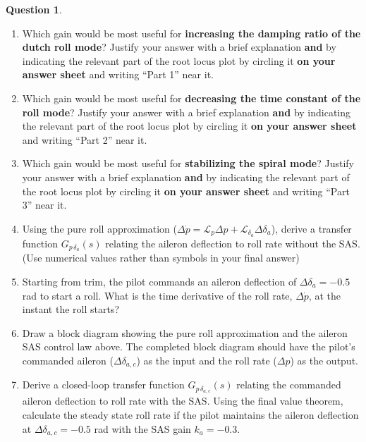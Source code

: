 \documentclass{article}
\theoremstyle{definition}
\newtheorem{question}{Question}
\begin{document}
\begin{question}
\begin{enumerate}[label=\alph*)]
    \item Which gain would be most useful for \textbf{increasing the damping ratio of the dutch roll mode}? Justify your answer with a brief explanation \textbf{and} by indicating the relevant part of the root locus plot by circling it \textbf{on your answer sheet} and writing ``Part 1'' near it.
    \item Which gain would be most useful for \textbf{decreasing the time constant of the roll mode}? Justify your answer with a brief explanation \textbf{and} by indicating the relevant part of the root locus plot by circling it \textbf{on your answer sheet} and writing ``Part 2'' near it.
    \item Which gain would be most useful for \textbf{stabilizing the spiral mode}? Justify your answer with a brief explanation \textbf{and} by indicating the relevant part of the root locus plot by circling it \textbf{on your answer sheet} and writing ``Part 3'' near it.
    \item Using the pure roll approximation ($\Delta \dot{p} = \mathcal{L}_p \Delta p + \mathcal{L}_{\delta_a} \Delta \delta_a$), derive a transfer function $G_{p\,\delta_a}(s)$ relating the aileron deflection to roll rate without the SAS. (Use numerical values rather than symbols in your final answer)
    \item Starting from trim, the pilot commands an aileron deflection of $\Delta \delta_a = -0.5$ rad to start a roll. What is the time derivative of the roll rate, $\Delta \Dot{p}$, at the instant the roll starts?
    \item Draw a block diagram showing the pure roll approximation and the aileron SAS control law above. The completed block diagram should have the pilot's commanded aileron ($\Delta \delta_{a,c}$) as the input and the roll rate ($\Delta p$) as the output. 
    \item Derive a closed-loop transfer function $G_{p\,\delta_{a,c}}(s)$ relating the commanded aileron deflection to roll rate with the SAS. Using the final value theorem, calculate the steady state roll rate if the pilot maintains the aileron deflection at $\Delta \delta_{a,c} = -0.5$ rad with the SAS gain $k_a = -0.3$.
   


\end{enumerate}
\end{question}
\end{document}
